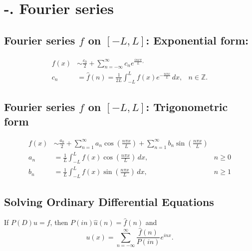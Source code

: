 \documentclass[11pt,icelandic]{article}
\begin{document}
\section*{-. Fourier series}

 \subsection*{Fourier series $f$ on $[-L,L]$: Exponential form:}
 
 \begin{align*}
  f(x) &\sim \frac{c_0}2 + \sum_{n=-\infty}^\infty c_n e^{\frac{inx\pi}{L},}\\
  c_n &= \hat f(n) = \frac 1{2L} \int_{-L}^L f(x) e^{-\frac{n\pi x}L}\, dx, & n\in \mathbb Z.
 \end{align*}


 \subsection*{Fourier series $f$ on $[-L,L]$: Trigonometric form}

 \begin{align*}
  f(x) &\sim \frac{a_0}2 + \sum_{n=1}^\infty a_n \cos\left(\frac {n\pi x}L \right) + \sum_{n=1}^{\infty}b_n \sin\left(\frac{n\pi x}L \right)\\
  a_n &= \frac 1L \int_{-L}^{L} f(x) \cos\left(\frac{n\pi x}L\right)\, dx, & n\geq 0\\
  b_n &= \frac 1L \int_{-L}^L f(x) \sin\left(\frac{n\pi x}L \right)\, dx, & n\geq 1
 \end{align*}

 \subsection*{Solving Ordinary Differential Equations}
  If $P(D)u=f$, then $P(in)\hat u(n) = \hat f(n)$ and
\[ u(x) = \sum_{n=-\infty}^{\infty} \frac{\hat f(n)}{P(in)}e^{inx}.\]
 
\end{document}
